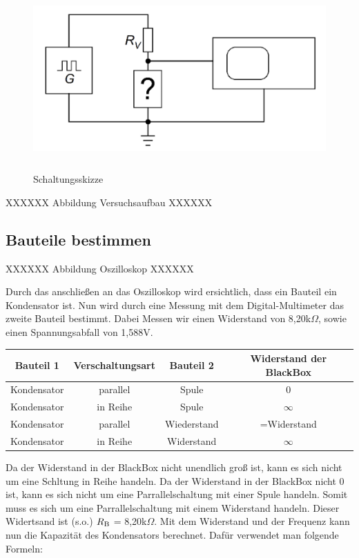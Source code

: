 \begin{figure}[H]
	\centering
	\includegraphics[height=7cm]{images/Versuch2/1_Schaltungsskizze.jpeg} 
	\caption{Schaltungsskizze}
	\label{fig: Schaltungsskizze}
\end{figure}

XXXXXX Abbildung Versuchsaufbau XXXXXX

\subsection{Bauteile bestimmen}

XXXXXX Abbildung Oszilloskop XXXXXX

Durch das anschließen an das Oszilloskop wird ersichtlich, dass ein Bauteil ein 
Kondensator ist. Nun wird durch eine Messung mit dem Digital-Multimeter das zweite
Bauteil bestimmt. Dabei Messen wir einen Widerstand von 8,20k$\Omega$, sowie einen
Spannungsabfall von 1,588V. 

\begin{tabular}[h]{c|c|c|c}
    \textbf{Bauteil 1} & \textbf{Verschaltungsart} & \textbf{Bauteil 2} & \textbf{Widerstand der BlackBox}\\
    \hline
    Kondensator & parallel & Spule & 0 \\
    \hline
    Kondensator & in Reihe & Spule & $\infty$ \\
    \hline
    Kondensator & parallel & Wiederstand & =Widerstand \\
	\hline
	Kondensator & in Reihe & Widerstand & $\infty$ 
    \label{tab:Versuch 2: Bauteile bestimmen}
\end{tabular}

Da der Widerstand in der BlackBox nicht unendlich groß ist, kann es sich nicht um
eine Schltung in Reihe handeln. Da der Widerstand in der BlackBox nicht 0 ist, kann
es sich nicht um eine Parrallelschaltung mit einer Spule handeln. Somit muss es sich
um eine Parrallelschaltung mit einem Widerstand handeln. Dieser Widertsand ist (s.o.) 
$R\textsubscript{B}$ = 8,20k$\Omega$.
Mit dem Widerstand und der Frequenz kann nun die Kapazität des Kondensators berechnet.
Dafür verwendet man folgende Formeln:

